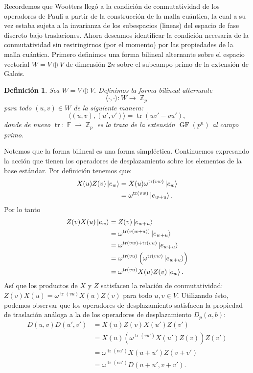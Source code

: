\documentclass[a4paper,11pt]{report}
\DeclareMathOperator{\Z}{\mathbb{Z}}
\DeclareMathOperator{\F}{\mathbb{F}}
\DeclareMathOperator{\tr}{tr}
\DeclareMathOperator{\GF}{GF}
\newtheorem{definition}{Definición}
\begin{document}
  Recordemos que Wootters llegó a la condición de
  conmutatividad de los operadores de Pauli a partir de la
  construcción de la malla cuántica, la cual a su vez estaba
  sujeta a la invarianza de los subespacios (lineas) del
  espacio de fase discreto bajo traslaciones. Ahora deseamos
  identificar la condición necesaria de la conmutatividad
  sin restringirnos (por el momento) por las propiedades de
  la malla cuántica. Primero definimos una forma bilineal
  alternante sobre el espacio vectorial $W = V \oplus V$ de
  dimensión $2n$ sobre el subcampo primo de la extensión de
  Galois. 
  \begin{definition}
    Sea $W = V \oplus V$. Definimos la forma bilineal
    alternante 
    \[
      \langle \cdot, \cdot \rangle : W \to \Z_p
    \]
    para todo $(u,v) \in W$ de la siguiente manera:
    \begin{equation}
      \label{eqn:bilinear_form}
      \langle (u,v), (u',v') \rangle
      = \tr\left( u v' - v u' \right),
    \end{equation}
    donde de nuevo $\tr : \F \to \Z_p$ es la traza de la
    extensión $\GF(p^{n})$ al campo primo. 
  \end{definition}
  Notemos que la forma bilineal es una forma simpléctica.
  Continuemos expresando la acción que tienen los operadores
  de desplazamiento sobre los elementos de la base estándar.
  Por definición tenemos que:
  \begin{align}
    X(u)Z(v) \ket{e_w}
    &= X(u) \omega^{\tr(v w)} \ket{e_w} \\
    &= \omega^{\tr(v w)} \ket{e_{w+u}}.
  \end{align}
  Por lo tanto
  \begin{align}
    Z(v)X(u) \ket{e_w}
    &= Z(v) \ket{e_{w+u}} \\
    &= \omega^{\tr(v (w+u))} \ket{e_{w+u}} \\
    &= \omega^{\tr(v w) + \tr(v u)}
    \ket{e_{w+u}} \\
    &= \omega^{\tr(v u)} \left( \omega^{\tr(v
    w)} \ket{e_{w+u}} \right) \\
    &= \omega^{\tr(v u)} X(u)Z(v) \ket{e_{w}}.
  \end{align}
  Así que los productos de $X$ y $Z$ satisfacen la relación
  de conmutatividad: $Z(v)X(u) = \omega^{\tr(v u)}
  X(u)Z(v)$ para todo $u,v \in V$. Utilizando ésto, podemos
  observar que los operadores de desplazamiento satisfacen
  la propiedad de traslación análoga a la de los operadores
  de desplazamiento $D_p(a,b)$:
  \begin{align}
    D(u,v) D(u',v')
    &= X(u)Z(v) X(u')Z(v') \\
    &= X(u) \left( \omega^{\tr(v u')} X(u') Z(v)
    \right) Z(v') \\
    &= \omega^{\tr(v u')} X(u+u') Z(v + v') \\
    &= \omega^{\tr(v u')} D(u+u',v+v')
    \label{eqn:disp_product_relation}.
  \end{align}
\end{document}
